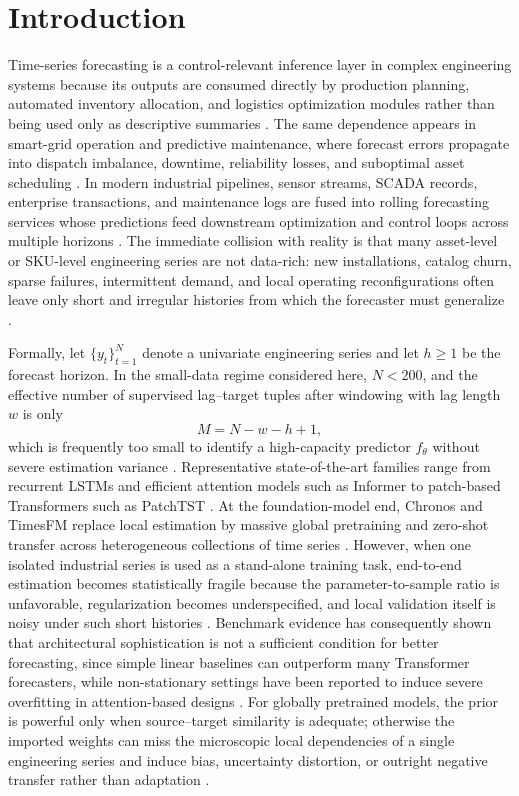 \documentclass[review,number,sort&compress]{elsarticle}
\begin{document}
\section{Introduction}

Time-series forecasting is a control-relevant inference layer in complex engineering systems because its outputs are consumed directly by production planning, automated inventory allocation, and logistics optimization modules rather than being used only as descriptive summaries \cite{park2024forchestra,li2022intermittent}. The same dependence appears in smart-grid operation and predictive maintenance, where forecast errors propagate into dispatch imbalance, downtime, reliability losses, and suboptimal asset scheduling \cite{kaur2020smartgrid,zhu2019pdm}. In modern industrial pipelines, sensor streams, SCADA records, enterprise transactions, and maintenance logs are fused into rolling forecasting services whose predictions feed downstream optimization and control loops across multiple horizons \cite{lim2021survey}. The immediate collision with reality is that many asset-level or SKU-level engineering series are not data-rich: new installations, catalog churn, sparse failures, intermittent demand, and local operating reconfigurations often leave only short and irregular histories from which the forecaster must generalize \cite{rozanec2021lumpy}.

Formally, let $\{y_t\}_{t=1}^{N}$ denote a univariate engineering series and let $h \ge 1$ be the forecast horizon. In the small-data regime considered here, $N<200$, and the effective number of supervised lag--target tuples after windowing with lag length $w$ is only
\[
M = N-w-h+1,
\]
which is frequently too small to identify a high-capacity predictor $f_\theta$ without severe estimation variance \cite{gao2023sedan,lim2021survey}. Representative state-of-the-art families range from recurrent LSTMs and efficient attention models such as Informer to patch-based Transformers such as PatchTST \cite{hochreiter1997lstm,zhou2021informer,nie2023patchtst}. At the foundation-model end, Chronos and TimesFM replace local estimation by massive global pretraining and zero-shot transfer across heterogeneous collections of time series \cite{ansari2024chronos,das2024timesfm}. However, when one isolated industrial series is used as a stand-alone training task, end-to-end estimation becomes statistically fragile because the parameter-to-sample ratio is unfavorable, regularization becomes underspecified, and local validation itself is noisy under such short histories \cite{gao2023sedan}. Benchmark evidence has consequently shown that architectural sophistication is not a sufficient condition for better forecasting, since simple linear baselines can outperform many Transformer forecasters, while non-stationary settings have been reported to induce severe overfitting in attention-based designs \cite{zeng2023dlinear,shen2023gbt}. For globally pretrained models, the prior is powerful only when source--target similarity is adequate; otherwise the imported weights can miss the microscopic local dependencies of a single engineering series and induce bias, uncertainty distortion, or outright negative transfer rather than adaptation \cite{ehrig2024similarity}.
\end{document}
